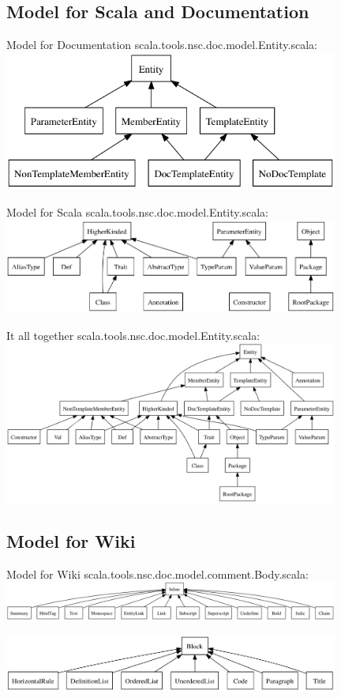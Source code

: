 \documentclass{beamer}
\begin{document}
\subsection{Model for Scala and Documentation}
\begin{frame}{Model for Documentation} 
	scala.tools.nsc.doc.model.Entity.scala:
	\includegraphics[width=11cm]{../docs/ScaladocModelDoc.png} %
\end{frame}

\begin{frame}{Model for Scala}  
	scala.tools.nsc.doc.model.Entity.scala: 
	\includegraphics[width=11cm]{../docs/ScaladocModelScala.png} %
\end{frame}

\begin{frame}{It all together}  
	scala.tools.nsc.doc.model.Entity.scala:
	\includegraphics[width=11cm]{../docs/ScaladocModelFull.png} 
\end{frame}


\subsection{Model for Wiki}
\begin{frame}{Model for Wiki} 
	scala.tools.nsc.doc.model.comment.Body.scala:
	\includegraphics[width=11cm]{../docs/ScaladocWikiModel1.png} 

	\includegraphics[width=11cm]{../docs/ScaladocWikiModel2.png} 
\end{frame}
\end{document}
